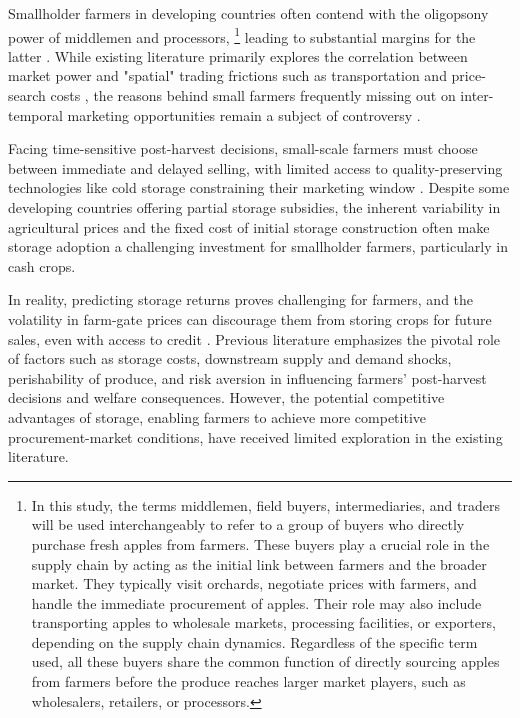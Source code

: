 Smallholder farmers in developing countries often contend with the oligopsony power of middlemen and processors, \footnote{In this study, the terms middlemen, field buyers, intermediaries, and traders will be used interchangeably to refer to a group of buyers who directly purchase fresh apples from farmers. These buyers play a crucial role in the supply chain by acting as the initial link between farmers and the broader market. They typically visit orchards, negotiate prices with farmers, and handle the immediate procurement of apples. Their role may also include transporting apples to wholesale markets, processing facilities, or exporters, depending on the supply chain dynamics. Regardless of the specific term used, all these buyers share the common function of directly sourcing apples from farmers before the produce reaches larger market players, such as wholesalers, retailers, or processors.} leading to substantial margins for the latter \citep{rogers_rich_1994assessing}. While existing literature primarily explores the correlation between market power and "spatial" trading frictions such as transportation and price-search costs \citep{bergquist_dinerstein_2020,mitra_mookherjee_torero_visaria_2018,ranjan_2017,antras_costinot_2011}, the reasons behind small farmers frequently missing out on inter-temporal marketing opportunities remain a subject of controversy \citep{williams1991storage, wright1984welfare, ruhinduka2020smallholder, lai2003optimal}.

Facing time-sensitive post-harvest decisions, small-scale farmers must choose between immediate and delayed selling, with limited access to quality-preserving technologies like cold storage constraining their marketing window \citep{aggarwal2018grain}. Despite some developing countries offering partial storage subsidies, the inherent variability in agricultural prices and the fixed cost of initial storage construction often make storage adoption a challenging investment for smallholder farmers, particularly in cash crops.

In reality, predicting storage returns proves challenging for farmers, and the volatility in farm-gate prices can discourage them from storing crops for future sales, even with access to credit \citep{cardell2023price}. Previous literature emphasizes the pivotal role of factors such as storage costs, downstream supply and demand shocks, perishability of produce, and risk aversion in influencing farmers' post-harvest decisions and welfare consequences. However, the potential competitive advantages of storage, enabling farmers to achieve more competitive procurement-market conditions, have received limited exploration in the existing literature.

